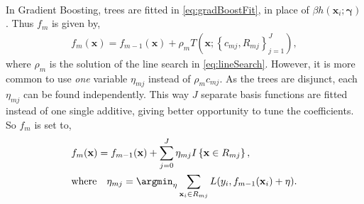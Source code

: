 \\
In Gradient Boosting, trees are fitted in \eqref{eq:gradBoostFit}, in place of $\beta h(\mathbf{x}_i; \bm{\gamma})$. Thus $f_m$ is given by, 
\begin{align}
  f_m(\mathbf{x}) = f_{m-1}(\mathbf{x}) + \rho_m T(\mathbf{x}; \left\{ c_{m j}, R_{m j} \right\}_{j=1}^{J}),
\end{align}
where $\rho_m$ is the solution of the line search in \eqref{eq:lineSearch}.  However, it is more common to use \textit{one} variable $\eta_{m j}$ instead of $\rho_m c_{m j}$. 
As the trees are disjunct, each $\eta_{m j}$ can be found independently.
This way $J$ separate basis functions are fitted instead of one single additive, giving better opportunity to tune the coefficients. So $f_m$ is set to,
\begin{align}
  &f_m(\mathbf{x}) = f_{m-1}(\mathbf{x}) +  \sum^{J}_{j=0} \eta_{m j} I\left\{ \mathbf{x} \in R_{m j} \right\}, \\
  \label{eq:etaLineSearch} 
  &\text{where} \quad
  \eta_{m j} = \argmin_\eta  \sum_{\mathbf{x}_i \in R_{m j}} L(y_i, f_{m-1}(\mathbf{x}_i) + \eta).
\end{align}

